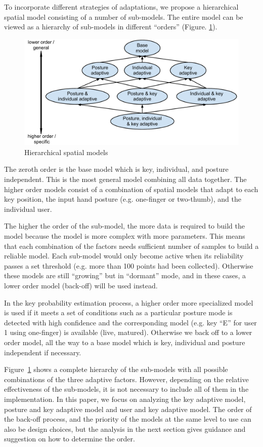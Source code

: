 \documentclass{sigchi}
\begin{document}
To incorporate different strategies of adaptations, we propose a hierarchical
spatial model consisting of a number of sub-models.
The entire model can be viewed as a hierarchy of sub-models in different
“orders” (Figure. \ref{fig:hierarchy}).

\begin{figure}[tb]
  \centering
  \includegraphics[width=0.9\columnwidth]{figures/hierarchy.pdf}
  \caption{Hierarchical spatial models}
  \label{fig:hierarchy}
\end{figure}

The zeroth order is the base model which is key, individual, and posture
independent. This is the most general model combining all data together. The
higher order models consist of a combination of spatial models that adapt to each
key position, the input hand 
posture (e.g. one-finger or two-thumb), and the individual user. 

The higher the order of the sub-model, the more data is required to build the model because
the model is more complex with more parameters. This means that each combination of the 
factors needs sufficient number of samples to build a reliable model. Each 
sub-model would only become active when its reliability passes a set 
threshold (e.g. more than 100 points had been collected). Otherwise these models
are still ``growing'' but in ``dormant'' mode, and in these cases, a lower order model (back-off) will
be used instead.

In the key probability estimation process, a higher order more specialized model
is used if it meets a set of conditions such as a particular posture mode is detected with high 
confidence and the corresponding model (e.g. key ``E'' for user 1 using
one-finger) is available (live, matured).
Otherwise we back off to a lower order model, all the way to a base model which 
is key, individual and posture independent if necessary. 

Figure~\ref{fig:hierarchy} shows a complete hierarchy of the sub-models with all
possible combinations of the three adaptive factors. However, depending on the
relative effectiveness of the sub-models, it is not necessary to include all of
them in the implementation. In this paper, we focus on analyzing the key
adaptive model, posture and key adaptive model and user and key adaptive model.
The order of the
back-off process, and the priority of the models at the same level to use can
also be design choices, but the analysis in the next section gives
guidance and suggestion on how to determine the order.
\end{document}
